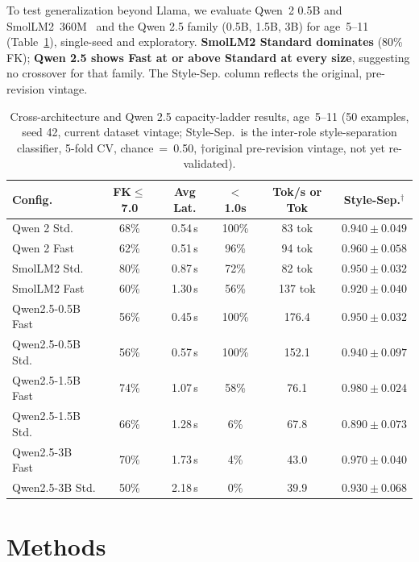 \documentclass[pdflatex,sn-mathphys-num]{sn-jnl-official}%
\begin{document}
To test generalization beyond Llama, we evaluate Qwen~2 0.5B and SmolLM2~360M~\cite{allal2025smollm2} and the Qwen 2.5 family (0.5B, 1.5B, 3B) for age~5--11 (Table~\ref{tab:crossarch}), single-seed and exploratory. \textbf{SmolLM2 Standard dominates} (80\% FK); \textbf{Qwen 2.5 shows Fast at or above Standard at every size}, suggesting no crossover for that family. The Style-Sep. column reflects the original, pre-revision vintage.

\begin{table}[!h]
  \centering
  \caption{Cross-architecture and Qwen 2.5 capacity-ladder results, age~5--11 (50 examples, seed 42, current dataset vintage; Style-Sep.\ is the inter-role style-separation classifier, 5-fold CV, chance~=~0.50, $\dagger$original pre-revision vintage, not yet re-validated).}
  \label{tab:crossarch}
  \scriptsize
  \setlength{\tabcolsep}{3pt}
  \begin{tabular}{@{}lccccc@{}}
    \toprule
    Config. & FK$\leq$7.0 & Avg Lat. & $<$1.0s & Tok/s or Tok & Style-Sep.$^\dagger$ \\
    \midrule
    Qwen 2 Std.       & 68\% & 0.54\,s & 100\% & 83 tok  & $0.940 \pm 0.049$ \\
    Qwen 2 Fast       & 62\% & 0.51\,s & 96\%  & 94 tok  & $0.960 \pm 0.058$ \\
    SmolLM2 Std.      & 80\% & 0.87\,s & 72\%  & 82 tok  & $0.950 \pm 0.032$ \\
    SmolLM2 Fast      & 60\% & 1.30\,s & 56\%  & 137 tok & $0.920 \pm 0.040$ \\
    Qwen2.5-0.5B Fast & 56\% & 0.45\,s & 100\% & 176.4   & $0.950 \pm 0.032$ \\
    Qwen2.5-0.5B Std. & 56\% & 0.57\,s & 100\% & 152.1   & $0.940 \pm 0.097$ \\
    Qwen2.5-1.5B Fast & 74\% & 1.07\,s & 58\%  & 76.1    & $\mathbf{0.980 \pm 0.024}$ \\
    Qwen2.5-1.5B Std. & 66\% & 1.28\,s & 6\%   & 67.8    & $0.890 \pm 0.073$ \\
    Qwen2.5-3B Fast   & 70\% & 1.73\,s & 4\%   & 43.0    & $0.970 \pm 0.040$ \\
    Qwen2.5-3B Std.   & 50\% & 2.18\,s & 0\%   & 39.9    & $0.930 \pm 0.068$ \\
    \bottomrule
  \end{tabular}
\end{table}

\section{Methods}\label{sec:methodology}
\end{document}
